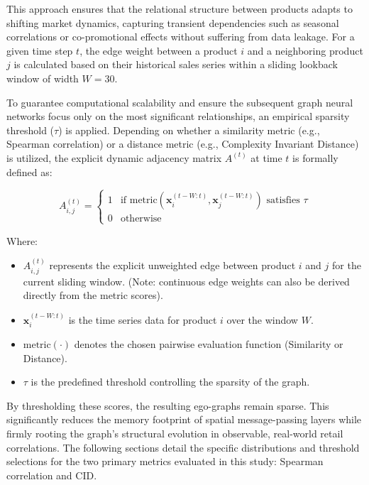 This approach ensures that the relational structure between products adapts to shifting market dynamics, capturing transient dependencies such as seasonal correlations or co-promotional effects without suffering from data leakage. For a given time step $t$, the edge weight between a product $i$ and a neighboring product $j$ is calculated based on their historical sales series within a sliding lookback window of width $W=30$. 

To guarantee computational scalability and ensure the subsequent graph neural networks focus only on the most significant relationships, an empirical sparsity threshold ($\tau$) is applied. Depending on whether a similarity metric (e.g., Spearman correlation) or a distance metric (e.g., Complexity Invariant Distance) is utilized, the explicit dynamic adjacency matrix $A^{(t)}$ at time $t$ is formally defined as:

\begin{equation}
A_{i,j}^{(t)} = 
\begin{cases} 
1 & \text{if metric}\left(\mathbf{x}_i^{(t-W:t)}, \mathbf{x}_j^{(t-W:t)}\right) \text{ satisfies } \tau \\ 
0 & \text{otherwise} 
\end{cases}
\end{equation}

Where:
\begin{itemize}
    \item $A_{i,j}^{(t)}$ represents the explicit unweighted edge between product $i$ and $j$ for the current sliding window. (Note: continuous edge weights can also be derived directly from the metric scores).
    \item $\mathbf{x}_i^{(t-W:t)}$ is the time series data for product $i$ over the window $W$.
    \item $\text{metric}(\cdot)$ denotes the chosen pairwise evaluation function (Similarity or Distance).
    \item $\tau$ is the predefined threshold controlling the sparsity of the graph.
\end{itemize}

By thresholding these scores, the resulting ego-graphs remain sparse. This significantly reduces the memory footprint of spatial message-passing layers while firmly rooting the graph's structural evolution in observable, real-world retail correlations. The following sections detail the specific distributions and threshold selections for the two primary metrics evaluated in this study: Spearman correlation and \ac{CID}.
